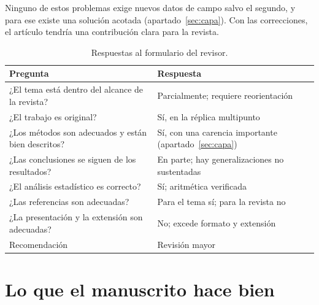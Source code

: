 \documentclass[11pt,a4paper]{article}
\begin{document}
Ninguno de estos problemas exige nuevos datos de campo salvo el segundo, y para ese existe una soluci\'on acotada (apartado~\ref{sec:capa}). Con las correcciones, el art\'iculo tendr\'ia una contribuci\'on clara para la revista.

\begin{table}[htbp]
	\centering
	\small
	\caption{Respuestas al formulario del revisor.}
	\begin{tabular}{@{}L{9.6cm}L{4.4cm}@{}}
		\toprule
		\textbf{Pregunta} & \textbf{Respuesta} \\
		\midrule
		¿El tema est\'a dentro del alcance de la revista? & Parcialmente; requiere reorientaci\'on \\
		¿El trabajo es original? & S\'i, en la r\'eplica multipunto \\
		¿Los m\'etodos son adecuados y est\'an bien descritos? & S\'i, con una carencia importante (apartado~\ref{sec:capa}) \\
		¿Las conclusiones se siguen de los resultados? & En parte; hay generalizaciones no sustentadas \\
		¿El an\'alisis estad\'istico es correcto? & S\'i; aritm\'etica verificada \\
		¿Las referencias son adecuadas? & Para el tema s\'i; para la revista no \\
		¿La presentaci\'on y la extensi\'on son adecuadas? & No; excede formato y extensi\'on \\
		Recomendaci\'on & Revisi\'on mayor \\
		\bottomrule
	\end{tabular}
\end{table}

\section{Lo que el manuscrito hace bien}
\end{document}
